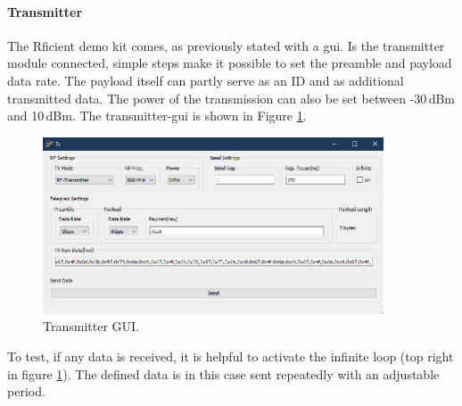 \paragraph{Transmitter}
The Rficient demo kit comes, as previously stated with a \acs{gui}.
Is the transmitter module connected, simple steps make it possible to set the preamble and payload data rate. 
The payload itself can partly serve as an ID and as additional transmitted data.
The power of the transmission can also be set between -30\,dBm and 10\,dBm.
The transmitter-\acs{gui} is shown in Figure \ref{development:tx}.
\begin{figure}[ht]
	\centering
	\includegraphics[width=0.9\textwidth]{4-development/hardware/graphics/TXgui.png}
	\caption{Transmitter GUI.\label{development:tx}}
\end{figure}
To test, if any data is received, it is helpful to activate the infinite loop (top right in figure \ref{development:tx}).
The defined data is in this case sent repeatedly with an adjustable period.

